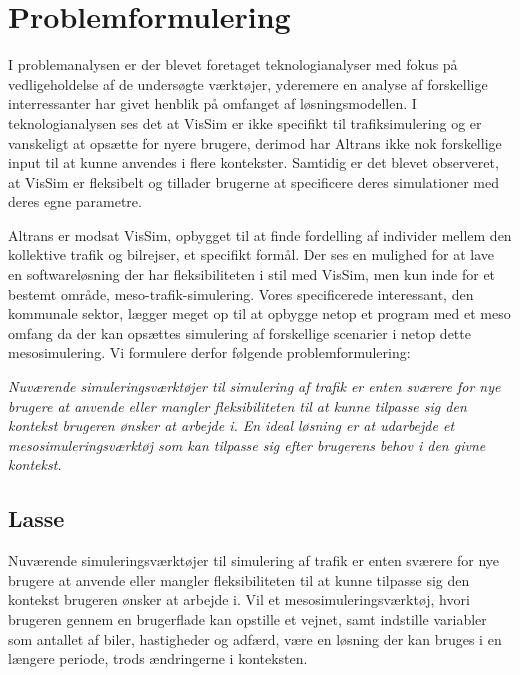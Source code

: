 \chapter{Problemformulering}\label{Problemformulering}

I problemanalysen er der blevet foretaget teknologianalyser med fokus på vedligeholdelse af de undersøgte værktøjer, yderemere en analyse af forskellige interressanter har givet henblik på omfanget af løsningsmodellen. I teknologianalysen ses det at VisSim er ikke specifikt til trafiksimulering og er vanskeligt at opsætte for nyere brugere, derimod har Altrans ikke nok forskellige input til at kunne anvendes i flere kontekster. Samtidig er det blevet observeret, at VisSim er fleksibelt og tillader brugerne at specificere deres simulationer med deres egne parametre.

\vspace{5mm}

Altrans er modsat VisSim, opbygget til at finde fordelling af individer mellem den kollektive trafik og bilrejser, et specifikt formål. Der ses en mulighed for at lave en softwareløsning der har fleksibiliteten i stil med VisSim, men kun inde for et bestemt område, meso-trafik-simulering. Vores specificerede interessant, den kommunale sektor, lægger meget op til at opbygge netop et program med et meso omfang da der kan opsættes simulering af forskellige scenarier i netop dette mesosimulering. Vi formulere derfor følgende problemformulering:

\vspace{5mm}

\begin{center}
\textit{Nuværende simuleringsværktøjer til simulering af trafik er enten sværere for nye brugere at anvende eller mangler fleksibiliteten til at kunne tilpasse sig den kontekst brugeren ønsker at arbejde i. En ideal løsning er at udarbejde et mesosimuleringsværktøj som kan tilpasse sig efter brugerens behov i den givne kontekst.}
\end{center}

\section{Lasse}
Nuværende simuleringsværktøjer til simulering af trafik er enten sværere for nye brugere at anvende eller mangler fleksibiliteten til at kunne tilpasse sig den kontekst brugeren ønsker at arbejde i. Vil et mesosimuleringsværktøj, hvori brugeren gennem en brugerflade kan opstille et vejnet, samt indstille variabler som antallet af biler, hastigheder og adfærd, være en løsning der kan bruges i en længere periode, trods ændringerne i konteksten.